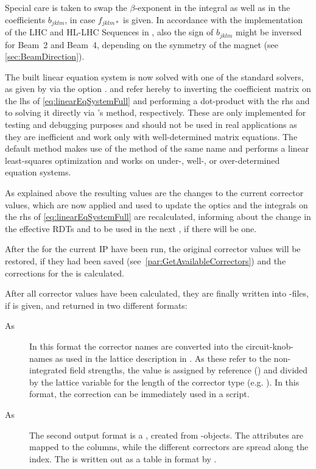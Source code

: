 Special care is taken to swap the $\beta$-exponent in the integral as well as in the coefficients $b_{jklm}$, in case $f_{jklm*}$ is given.
In accordance with the implementation of the LHC and HL-LHC Sequences in , also the sign of $b_{jklm}$ might be inversed for Beam~2 
and Beam~4, depending on the symmetry of the magnet (see \cref{sec:BeamDirection}). 
 

\label{par:SolveEquationSystem}

The built linear equation system is now solved with one of the standard solvers, as given by via the option .
 and  refer hereby to inverting the coefficient matrix on the lhs of \cref{eq:linearEqSystemFull} 
and performing a dot-product with the rhs and to solving it directly via 's  method, respectively.
These are only implemented for testing and debugging purposes and should not be used in real applications as they are inefficient
and work only with well-determined matrix equations.
The default method  makes use of the  method of the same name and performs a linear least-squares optimization
and works on under-, well-, or over-determined equation systems.

As explained above the resulting values are the changes to the current corrector values, 
which are now applied and used to update the optics and the integrals on the rhs of \cref{eq:linearEqSystemFull} are
recalculated, informing about the change in the effective RDTs and to be used in the next , if there will be one. 

After the  for the current IP have been run,
the original corrector values will be restored, if they had been saved (see~\cref{par:GetAvailableCorrectors}) 
and the corrections for the  is calculated.


\label{par:Output}
After all corrector values have been calculated, they are finally written into -files, if  is given, and returned 
in two different formats:
\begin{description}
  \item[As ] In this format the corrector names are converted into the circuit-knob-names as used in the lattice description in .
                        As these refer to the non-integrated field strengths, the value is assigned by reference (\ttt{:=}) and divided by 
                        the lattice variable for the length of the corrector type (e.g. ).
                        In this format, the correction can be immediately used in a  script.    
  \item[As ] The second output format is a , created from -objects. 
                        The attributes are mapped to the columns, while the different correctors are spread along the index.
                        The  is written out as a table in  format by .
\end{description}


